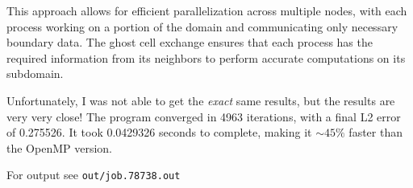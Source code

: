 \documentclass{article}
\begin{document}
This approach allows for efficient parallelization across multiple nodes, with each process working on a portion of the domain and communicating only necessary boundary data. The ghost cell exchange ensures that each process has the required information from its neighbors to perform accurate computations on its subdomain.

Unfortunately, I was not able to get the \textit{exact} same results, but the results are very very close! The program converged in 4963 iterations, with a final L2 error of 0.275526. It took 0.0429326 seconds to complete, making it $\sim 45\%$ faster than the OpenMP version.

For output see \texttt{out/job.78738.out}
\end{document}
